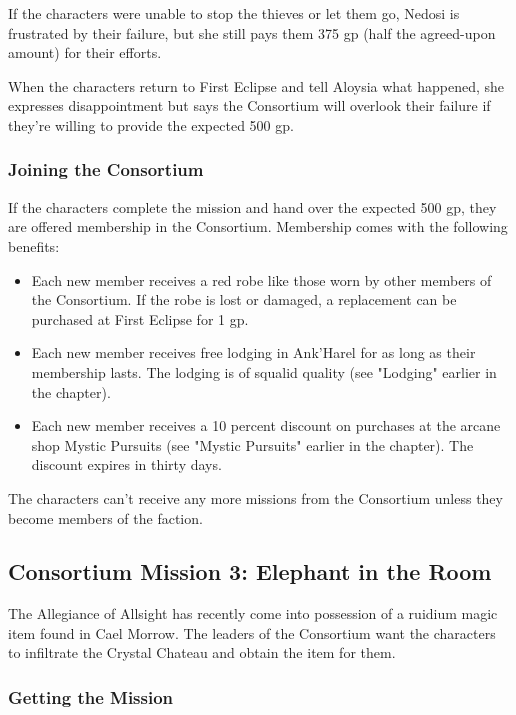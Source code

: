 \documentclass[a4paper, 11pt, bg=full, twocolumn, nooutline]{dndbook}
\begin{document}
If the characters were unable to stop the thieves or let them go, Nedosi is frustrated by their failure, but she still pays them 375 gp (half the agreed-upon amount) for their efforts.

When the characters return to First Eclipse and tell Aloysia what happened, she expresses disappointment but says the Consortium will overlook their failure if they're willing to provide the expected 500 gp.

\subsubsection{Joining the Consortium}

If the characters complete the mission and hand over the expected 500 gp, they are offered membership in the Consortium. Membership comes with the following benefits:

\begin{itemize}
\item Each new member receives a red robe like those worn by other members of the Consortium. If the robe is lost or damaged, a replacement can be purchased at First Eclipse for 1 gp.
\item Each new member receives free lodging in Ank'Harel for as long as their membership lasts. The lodging is of squalid quality (see "Lodging" earlier in the chapter).
\item Each new member receives a 10 percent discount on purchases at the arcane shop Mystic Pursuits (see "Mystic Pursuits" earlier in the chapter). The discount expires in thirty days.
\end{itemize}

The characters can't receive any more missions from the Consortium unless they become members of the faction.

\subsection{Consortium Mission 3: Elephant in the Room}

The Allegiance of Allsight has recently come into possession of a ruidium magic item found in Cael Morrow. The leaders of the Consortium want the characters to infiltrate the Crystal Chateau and obtain the item for them.

\subsubsection{Getting the Mission}
\end{document}
